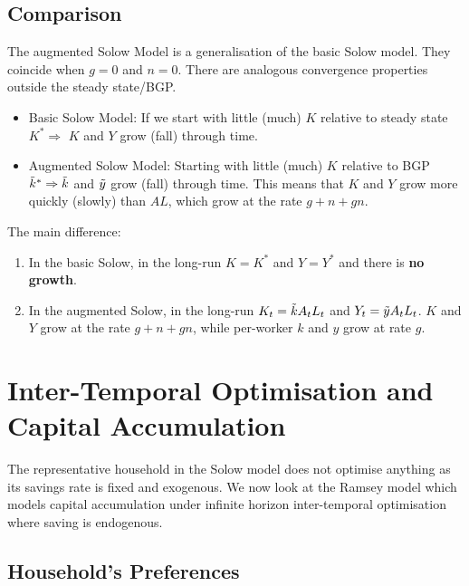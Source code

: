 \documentclass[11pt]{article}
\begin{document}
\begin{shaded}
\subsection{Comparison}

The augmented Solow Model is a generalisation of the basic Solow model. They coincide when $g=0$ and $n=0$. There are analogous convergence properties outside the steady state/BGP.

\begin{itemize}
    \item Basic Solow Model: If we start with little (much) $K$ relative to steady state $K^* \Rightarrow$ $K$ and $Y$ grow (fall) through time.

    \item Augmented Solow Model: Starting with little (much) $K$ relative to BGP $\Tilde{k}^* \Rightarrow \Tilde{k}$ and $\Tilde{y}$ grow (fall) through time. This means that $K$ and $Y$ grow more quickly (slowly) than $AL$, which grow at the rate $g+n+gn$.
\end{itemize}

The main difference:
\begin{enumerate}
    \item In the basic Solow, in the long-run $K=K^*$ and $Y=Y^*$ and there is \textbf{no growth}.
    \item In the augmented Solow, in the long-run $K_t = \Tilde{k}A_tL_t$ and $Y_t = \Tilde{y}A_tL_t$. $K$ and $Y$ grow at the rate $g+n+gn$, while per-worker $k$ and $y$ grow at rate $g$.
\end{enumerate}


\end{shaded}


\section{Inter-Temporal Optimisation and Capital Accumulation}

The representative household in the Solow model does not optimise anything as its savings rate is fixed and exogenous. We now look at the Ramsey model which models capital accumulation under infinite horizon inter-temporal optimisation where saving is endogenous.

\subsection{Household's Preferences}
\end{document}
